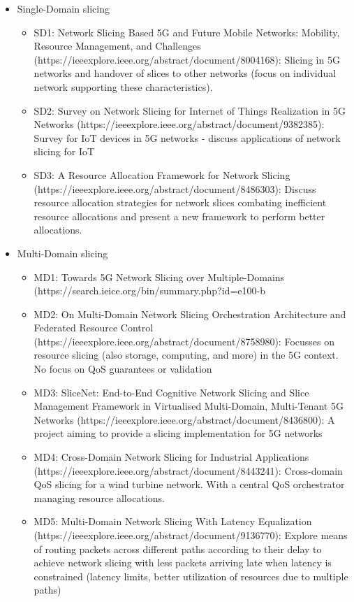\begin{itemize}
    \item Single-Domain slicing
    \begin{itemize}
        \item SD1: Network Slicing Based 5G and Future Mobile Networks: Mobility, Resource Management, and Challenges (https://ieeexplore.ieee.org/abstract/document/8004168): Slicing in 5G networks and handover of slices to other networks (focus on individual network supporting these characteristics).
        \item SD2: Survey on Network Slicing for Internet of Things Realization in 5G Networks (https://ieeexplore.ieee.org/abstract/document/9382385): Survey for IoT devices in 5G networks - discuss applications of network slicing for IoT
        \item SD3: A Resource Allocation Framework for Network Slicing (https://ieeexplore.ieee.org/abstract/document/8486303): Discuss resource allocation strategies for network slices combating inefficient resource allocations and present a new framework to perform better allocations.
    \end{itemize}
    \item Multi-Domain slicing
    \begin{itemize}
        \item MD1: Towards 5G Network Slicing over Multiple-Domains (https://search.ieice.org/bin/summary.php?id=e100-b%
        \item MD2: On Multi-Domain Network Slicing Orchestration Architecture and Federated Resource Control (https://ieeexplore.ieee.org/abstract/document/8758980): Focusses on resource slicing (also storage, computing, and more) in the 5G context. No focus on QoS guarantees or validation
        \item MD3: SliceNet: End-to-End Cognitive Network Slicing and Slice Management Framework in Virtualised Multi-Domain, Multi-Tenant 5G Networks (https://ieeexplore.ieee.org/abstract/document/8436800): A project aiming to provide a slicing implementation for 5G networks
        \item MD4: Cross-Domain Network Slicing for Industrial Applications (https://ieeexplore.ieee.org/abstract/document/8443241): Cross-domain QoS slicing for a wind turbine network. With a central QoS orchestrator managing resource allocations.
        \item MD5: Multi-Domain Network Slicing With Latency Equalization (https://ieeexplore.ieee.org/abstract/document/9136770): Explore means of routing packets across different paths according to their delay to achieve network slicing with less packets arriving late when latency is constrained (latency limits, better utilization of resources due to multiple paths)

\end{itemize}
\end{itemize}
